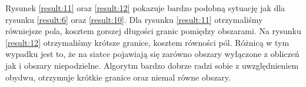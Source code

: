 Rysunek \ref{result:11} oraz \ref{result:12} pokazuje bardzo podobną sytuację jak dla rysunku \ref{result:6} oraz
\ref{result:10}.
Dla rysunku \ref{result:11} otrzymaliśmy równiejsze pola, kosztem gorszej długości granic pomiędzy obszarami.
Na rysunku \ref{result:12} otrzymaliśmy krótsze granice, kosztem równości pól.
Różnicą w tym wypadku jest to, że na siatce pojawiają się zarówno obszary wyłączone z obliczeń jak i
obszary niepodzielne.
Algorytm bardzo dobrze radzi sobie z uwzględnieniem obydwu, otrzymuje krótkie granice oraz niemal równe obszary.
\begin{figure}[h]
\centering
\begin{subfigure}{.33\textwidth}
    \centering
    \caption[short]{}
\end{subfigure}%
\begin{subfigure}{.33\textwidth}
    \centering
    \caption[short]{}
\end{subfigure}%

\end{figure}
